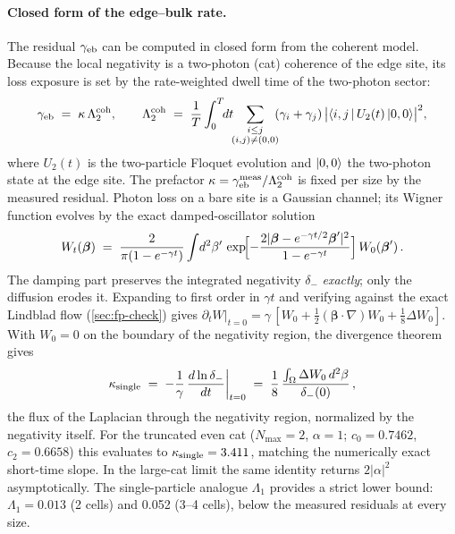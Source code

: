 \documentclass[aps,pra,preprint,superscriptaddress,amsmath,amssymb]{revtex4-2}
\begin{document}
\paragraph{Closed form of the edge--bulk rate.}
The residual $\gamma_{\rm eb}$ can be computed in closed form from the coherent model. Because the local negativity is a two-photon (cat) coherence of the edge site, its loss exposure is set by the rate-weighted dwell time of the two-photon sector:
\begin{equation}
  \gamma_{\rm eb}\;=\;\kappa\,\Lambda_2^{\rm coh},\qquad
  \Lambda_2^{\rm coh}\;=\;\frac1T\int_0^T\!\!dt
  \!\!\sum_{\substack{i\le j\\(i,j)\neq(0,0)}}\!\!(\gamma_i+\gamma_j)
  \,\bigl|\braket{i,j\,|\,U_2(t)\,|0,0}\bigr|^2,
  \label{eq:gammas-eb-closed}
\end{equation}
where $U_2(t)$ is the two-particle Floquet evolution and $\ket{0,0}$ the two-photon state at the edge site. The prefactor $\kappa=\gamma_{\rm eb}^{\rm meas}/\Lambda_2^{\rm coh}$ is fixed per size by the measured residual. Photon loss on a bare site is a Gaussian channel; its Wigner function evolves by the exact damped-oscillator solution
\begin{equation}\label{eq:fp-loss}
  W_t(\boldsymbol\beta)\;=\;\frac{2}{\pi(1-e^{-\gamma t})}
    \int\!d^2\beta'\,
    \exp\!\Bigl[-\frac{2|\boldsymbol\beta-e^{-\gamma t/2}\boldsymbol\beta'|^2}
      {1-e^{-\gamma t}}\Bigr]\,W_0(\boldsymbol\beta')\,.
\end{equation}
The damping part preserves the integrated negativity $\delta_-$ \emph{exactly}; only the diffusion erodes it. Expanding to first order in $\gamma t$ and verifying against the exact Lindblad flow (\cref{sec:fp-check}) gives $\partial_t W|_{t=0}=\gamma\,[W_0+\tfrac12(\boldsymbol\beta\cdot\nabla)W_0+\tfrac18\Delta W_0]$. With $W_0=0$ on the boundary of the negativity region, the divergence theorem gives
\begin{equation}\label{eq:kappa-single-closed}
  \kappa_{\rm single}\;=\;-\frac1\gamma\,\frac{d\ln\delta_-}{dt}\bigg|_{t=0}
    \;=\;\frac18\,\frac{\int_\Omega\Delta W_0\,d^2\beta}{\delta_-(0)}\,,
\end{equation}
the flux of the Laplacian through the negativity region, normalized by the negativity itself. For the truncated even cat ($N_{\max}=\num{2}$, $\alpha=\num{1}$; $c_0=\num{0.7462}$, $c_2=\num{0.6658}$) this evaluates to $\kappa_{\rm single}=\num{3.411}$, matching the numerically exact short-time slope. In the large-cat limit the same identity returns $2|\alpha|^2$ asymptotically. The single-particle analogue $\Lambda_1$ provides a strict lower bound: $\Lambda_1=\num{0.013}$ (2 cells) and \num{0.052} (3--4 cells), below the measured residuals at every size.
\end{document}

